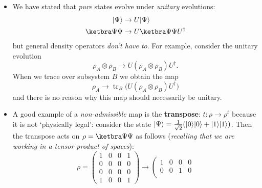 \documentclass[10pt]{article}
\DeclarePairedDelimiter\ket{\lvert}{\rangle}
\DeclareMathOperator{\tr}{tr}
\begin{document}
            \begin{itemize}
                \item We have stated that \emph{pure} states evolve under \emph{unitary} evolutions:
                    \begin{align*}
                        \ket\Psi&\to U\ket\Psi\\
                        \ketbra\Psi\Psi&\to U\ketbra\Psi\Psi U^\dagger
                    \end{align*}
                    but general density operators \emph{don't have to}.
                    For example, consider the unitary \mbox{evolution}
                    \begin{equation*}
                        \rho_A\otimes\rho_B\to U(\rho_A\otimes\rho_B)U^\dagger.
                    \end{equation*}
                    When we trace over subsystem $B$ we obtain the map
                    \begin{equation*}
                        \rho_A\to\tr_B\big(U(\rho_A\otimes\rho_B)U^\dagger\big)
                    \end{equation*}
                    and there is no reason why this map should necessarily be unitary.
                \item A good example of a \emph{non-admissible} map is the \textbf{transpose}: $t\colon\rho\to\rho^t$ because it is not `physically legal': consider the state $\ket\Psi=\frac1{\sqrt2}(\ket0\ket0+\ket1\ket1)$.
                    Then the transpose acts on $\rho=\ketbra\Psi\Psi$ as follows (\emph{recalling that we are working in a tensor product of spaces}):
                    \begin{equation*}
                        \rho=\left(
                        \begin{array}{cc|cc}
                            1 & 0 & 0 & 1\\
                            0 & 0 & 0 & 0\\
                            \hline
                            0 & 0 & 0 & 0\\
                            1 & 0 & 0 & 1
                        \end{array}
                        \right)\to\left(
                        \begin{array}{cc|cc}
                            1 & 0 & 0 & 0\\
                            0 & 0 & 1 & 0\\

\end{array}
\end{equation*}
\end{itemize}
\end{document}
